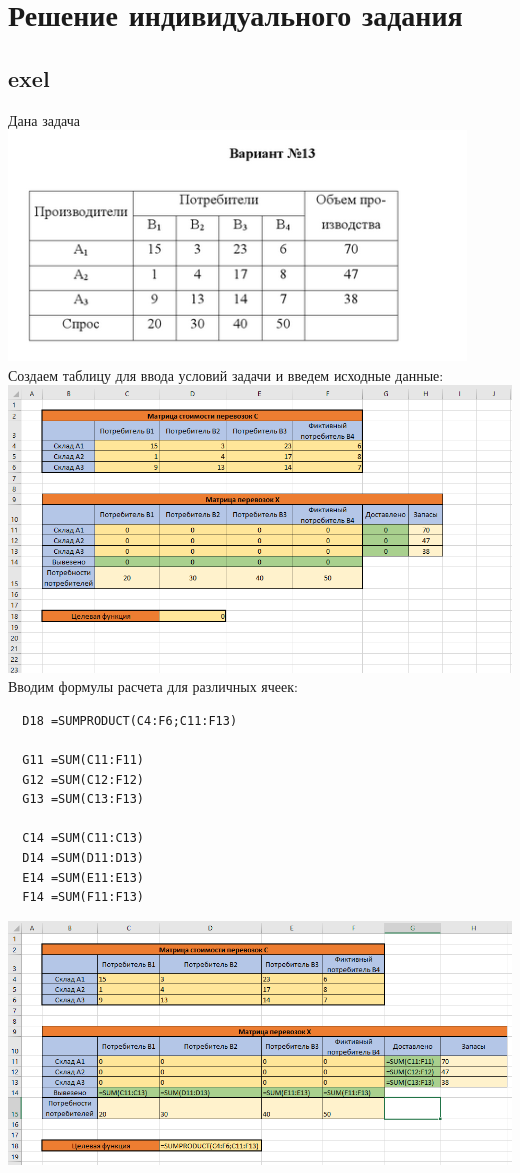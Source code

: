 \documentclass[a4paper, 12pt]{article}
\begin{document}
\section{Решение индивидуального задания}
\subsection{exel}
Дана задача \\
\includegraphics{2-1.png}\\
Создаем таблицу для ввода условий задачи и введем исходные данные:\\

\includegraphics[width=\textwidth]{2-2.png}\\

Вводим формулы расчета для различных ячеек:
\begin{verbatim}
  D18 =SUMPRODUCT(C4:F6;C11:F13)

  G11 =SUM(C11:F11)
  G12 =SUM(C12:F12)
  G13 =SUM(C13:F13)

  C14 =SUM(C11:C13)
  D14 =SUM(D11:D13)
  E14 =SUM(E11:E13)
  F14 =SUM(F11:F13)
\end{verbatim}

\includegraphics[width=\textwidth]{2-3.png}\\
\end{document}
